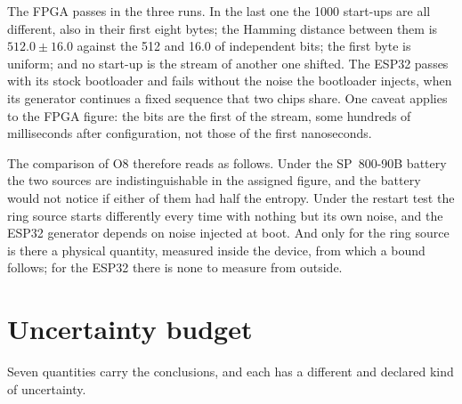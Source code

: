 The \ac{FPGA} passes in the three runs. In the last one the 1000
start-ups are all different, also in their first eight bytes; the Hamming
distance between them is $512.0 \pm 16.0$ against the 512 and 16.0 of
independent bits; the first byte is uniform; and no start-up is the
stream of another one shifted. The ESP32 passes with its stock
bootloader and fails without the noise the bootloader injects, when its
generator continues a fixed sequence that two chips share. One caveat
applies to the \ac{FPGA} figure: the bits are the first of the stream,
some hundreds of milliseconds after configuration, not those of the first
nanoseconds.

The comparison of O8 therefore reads as follows. Under the SP~800-90B
battery the two sources are indistinguishable in the assigned figure,
and the battery would not notice if either of them had half the entropy.
Under the restart test the ring source starts differently every time
with nothing but its own noise, and the ESP32 generator depends on
noise injected at boot. And only for the ring source is there a
physical quantity, measured inside the device, from which a bound
follows; for the ESP32 there is none to measure from outside.

\section{Uncertainty budget}
\label{sec:uncertainty}

Seven quantities carry the conclusions, and each has a different and
declared kind of uncertainty.

